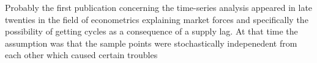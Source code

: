 Probably the first publication concerning the time-series analysis appeared in late twenties \cite{citeulike:3994561} \cite{citeulike:3994263} \cite{citeulike:3994742} in the field of econometrics explaining market forces and specifically the possibility of getting cycles as a consequence of a supply lag. At that time the assumption was that the sample points were stochastically indepenedent from each other which caused certain troubles
